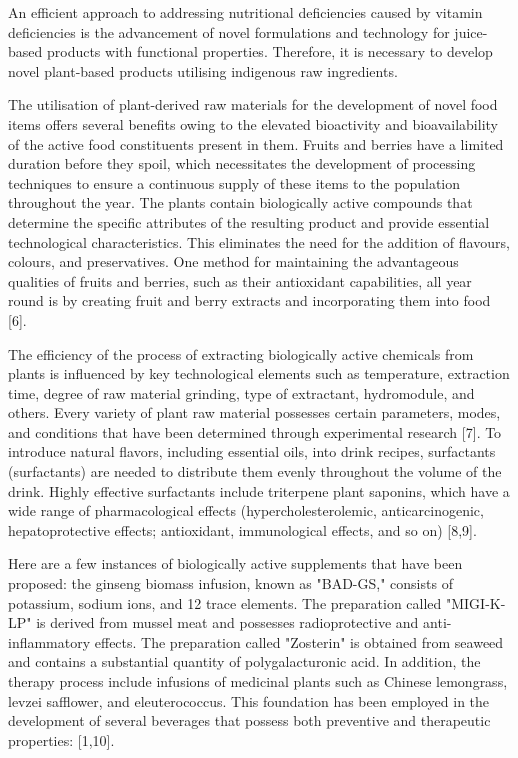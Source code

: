 An efficient approach to addressing nutritional deficiencies caused by
vitamin deficiencies is the advancement of novel formulations and
technology for juice-based products with functional properties.
Therefore, it is necessary to develop novel plant-based products
utilising indigenous raw ingredients.~

The utilisation of plant-derived raw materials for the development of
novel food items offers several benefits owing to the elevated
bioactivity and bioavailability of the active food constituents present
in them. Fruits and berries have a limited duration before they spoil,
which necessitates the development of processing techniques to ensure a
continuous supply of these items to the population throughout the year.
The plants contain biologically active compounds that determine the
specific attributes of the resulting product and provide essential
technological characteristics. This eliminates the need for the addition
of flavours, colours, and preservatives. One method for maintaining the
advantageous qualities of fruits and berries, such as their antioxidant
capabilities, all year round is by creating fruit and berry extracts and
incorporating them into food {[}6{]}.~

The efficiency of the process of extracting biologically active
chemicals from plants is influenced by key technological elements such
as temperature, extraction time, degree of raw material grinding, type
of extractant, hydromodule, and others. Every variety of plant raw
material possesses certain parameters, modes, and conditions that have
been determined through experimental research {[}7{]}. To introduce
natural flavors, including essential oils, into drink recipes,
surfactants (surfactants) are needed to distribute them evenly
throughout the volume of the drink. Highly effective surfactants include
triterpene plant saponins, which have a wide range of pharmacological
effects (hypercholesterolemic, anticarcinogenic, hepatoprotective
effects; antioxidant, immunological effects, and so on) {[}8,9{]}.

Here are a few instances of biologically active supplements that have
been proposed: the ginseng biomass infusion, known as "BAD-GS," consists
of potassium, sodium ions, and 12 trace elements. The preparation called
"MIGI-K-LP" is derived from mussel meat and possesses radioprotective
and anti-inflammatory effects. The preparation called "Zosterin" is
obtained from seaweed and contains a substantial quantity of
polygalacturonic acid. In addition, the therapy process include
infusions of medicinal plants such as Chinese lemongrass, levzei
safflower, and eleuterococcus. This foundation has been employed in the
development of several beverages that possess both preventive and
therapeutic properties: {[}1,10{]}.

